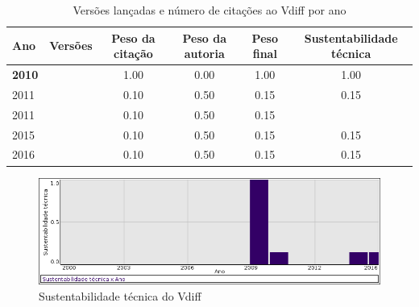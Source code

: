 \begin{table}[H]
\caption{Versões lançadas e número de citações ao Vdiff por ano}
\centering
\begin{tabular}{| l | c | c | c | c | c |}
  \hline
  Ano & Versões & Peso da citação & Peso da autoria & Peso final & Sustentabilidade técnica \\
  \hline
            {\bf 2010}
          &
          
          &
          1.00
          &
          0.00
          &
          1.00
          &
            {\color{blue} 1.00}
          \\
\hline
            2011
          &
          
          &
          0.10
          &
          0.50
          &
          0.15
          &
            {\color{red} 0.15}
          \\
            2011
          &
          
          &
          0.10
          &
          0.50
          &
          0.15
          &
          \\
\hline
            2015
          &
          
          &
          0.10
          &
          0.50
          &
          0.15
          &
            {\color{red} 0.15}
          \\
\hline
            2016
          &
          
          &
          0.10
          &
          0.50
          &
          0.15
          &
            {\color{red} 0.15}
          \\
\hline
\end{tabular}
\end{table}

\begin{figure}[h]
  \center
  \includegraphics[scale=0.50]{result-documents/charts/vdiff.png}
  \caption{Sustentabilidade técnica do Vdiff}
\end{figure}


